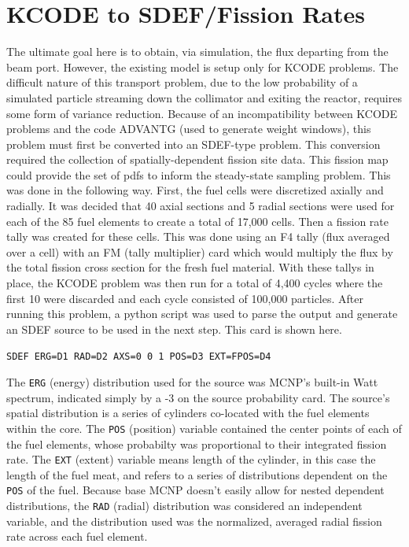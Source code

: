 \section{KCODE to SDEF/Fission Rates}

The ultimate goal here is to obtain, via simulation, the flux departing from the beam port.
However, the existing model is setup only for KCODE problems.
The difficult nature of this transport problem, due to the low probability of a simulated particle streaming down the collimator and exiting the reactor, requires some form of variance reduction.
Because of an incompatibility between KCODE problems and the code ADVANTG (used to generate weight windows), this problem must first be converted into an SDEF-type problem.
This conversion required the collection of spatially-dependent fission site data.
This fission map could provide the set of pdfs to inform the steady-state sampling problem.
This was done in the following way.
First, the fuel cells were discretized axially and radially.
It was decided that 40 axial sections and 5 radial sections were used for each of the 85 fuel elements to create a total of 17,000 cells.
Then a fission rate tally was created for these cells.
This was done using an F4 tally (flux averaged over a cell) with an FM (tally multiplier) card which would multiply the flux by the total fission cross section for the fresh fuel material.
With these tallys in place, the KCODE problem was then run for a total of 4,400 cycles where the first 10 were discarded and each cycle consisted of 100,000 particles.
After running this problem, a python script was used to parse the output and generate an SDEF source to be used in the next step.
This card is shown here.

\begin{center}
{\tt SDEF ERG=D1 RAD=D2  AXS=0 0 1  POS=D3  EXT=FPOS=D4}
\end{center}

The {\tt ERG} (energy) distribution used for the source was MCNP's built-in Watt spectrum, indicated simply by a -3 on the source probability card.
The source's spatial distribution is a series of cylinders co-located with the fuel elements within the core.
The {\tt POS} (position) variable contained the center points of each of the fuel elements, whose probabilty was proportional to their integrated fission rate.
The {\tt EXT} (extent) variable means length of the cylinder, in this case the length of the fuel meat, and refers to a series of distributions dependent on the {\tt POS} of the fuel.
Because base MCNP doesn't easily allow for nested dependent distributions, the {\tt RAD} (radial) distribution was considered an independent variable, and the distribution used was the normalized, averaged radial fission rate across each fuel element.

